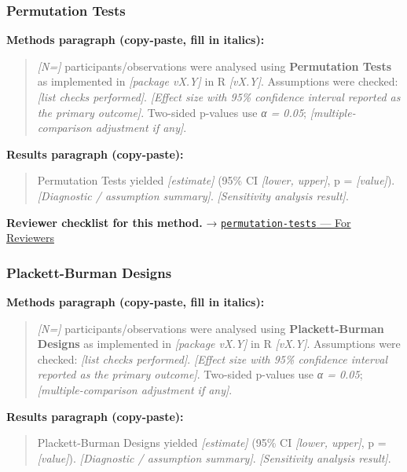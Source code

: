\documentclass[
]{article}
\begin{document}
\subsubsection{Permutation Tests}\label{permutation-tests}

\textbf{Methods paragraph (copy-paste, fill in italics):}

\begin{quote}
\emph{{[}N={]}} participants/observations were analysed using
\textbf{Permutation Tests} as implemented in \emph{{[}package vX.Y{]}}
in R \emph{{[}vX.Y{]}}. Assumptions were checked: \emph{{[}list checks
performed{]}}. \emph{{[}Effect size with 95\% confidence interval
reported as the primary outcome{]}}. Two-sided p-values use \emph{α =
0.05}; \emph{{[}multiple-comparison adjustment if any{]}}.
\end{quote}

\textbf{Results paragraph (copy-paste):}

\begin{quote}
Permutation Tests yielded \emph{{[}estimate{]}} (95\% CI \emph{{[}lower,
upper{]}}, p = \emph{{[}value{]}}). \emph{{[}Diagnostic / assumption
summary{]}}. \emph{{[}Sensitivity analysis result{]}}.
\end{quote}

\textbf{Reviewer checklist for this method.} →
\href{../chapters/04-inferential/permutation-tests.Rmd\#for-reviewers}{\texttt{permutation-tests}
--- For Reviewers}

\subsubsection{Plackett-Burman Designs}\label{plackett-burman-designs}

\textbf{Methods paragraph (copy-paste, fill in italics):}

\begin{quote}
\emph{{[}N={]}} participants/observations were analysed using
\textbf{Plackett-Burman Designs} as implemented in \emph{{[}package
vX.Y{]}} in R \emph{{[}vX.Y{]}}. Assumptions were checked: \emph{{[}list
checks performed{]}}. \emph{{[}Effect size with 95\% confidence interval
reported as the primary outcome{]}}. Two-sided p-values use \emph{α =
0.05}; \emph{{[}multiple-comparison adjustment if any{]}}.
\end{quote}

\textbf{Results paragraph (copy-paste):}

\begin{quote}
Plackett-Burman Designs yielded \emph{{[}estimate{]}} (95\% CI
\emph{{[}lower, upper{]}}, p = \emph{{[}value{]}}). \emph{{[}Diagnostic
/ assumption summary{]}}. \emph{{[}Sensitivity analysis result{]}}.
\end{quote}
\end{document}
